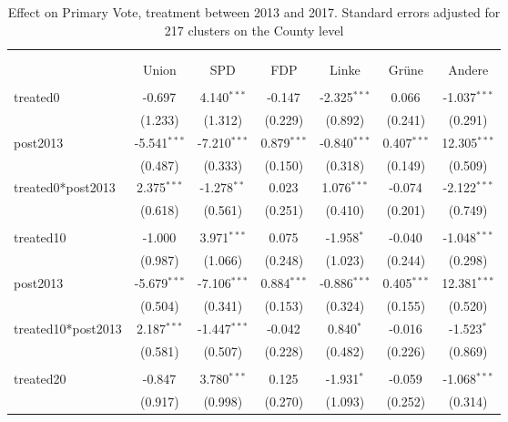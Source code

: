 \documentclass[12pt]{article}
\begin{document}
 
\begin{table}[!htbp] \centering
  \caption{Effect on Primary Vote, treatment between 2013 and 2017. Standard errors adjusted for 217 clusters on the County level}
\begin{tabular}{@{\extracolsep{5pt}}lcccccc}
\\[-1.8ex]\hline
\hline \\[-1.8ex]
\\[-1.8ex] & \multicolumn{1}{c}{Union} & \multicolumn{1}{c}{SPD} & \multicolumn{1}{c}{FDP} & \multicolumn{1}{c}{Linke} & \multicolumn{1}{c}{Grüne} & \multicolumn{1}{c}{Andere}  \\
\hline \\[-1.8ex]
 treated0 & -0.697$^{}$ & 4.140$^{***}$ & -0.147$^{}$ & -2.325$^{***}$ & 0.066$^{}$ & -1.037$^{***}$ \\
  & (1.233) & (1.312) & (0.229) & (0.892) & (0.241) & (0.291) \\
 post2013 & -5.541$^{***}$ & -7.210$^{***}$ & 0.879$^{***}$ & -0.840$^{***}$ & 0.407$^{***}$ & 12.305$^{***}$ \\
  & (0.487) & (0.333) & (0.150) & (0.318) & (0.149) & (0.509) \\
 treated0*post2013 & 2.375$^{***}$ & -1.278$^{**}$ & 0.023$^{}$ & 1.076$^{***}$ & -0.074$^{}$ & -2.122$^{***}$ \\
  & (0.618) & (0.561) & (0.251) & (0.410) & (0.201) & (0.749) \\
\hline \\[-1.8ex]
 treated10 & -1.000$^{}$ & 3.971$^{***}$ & 0.075$^{}$ & -1.958$^{*}$ & -0.040$^{}$ & -1.048$^{***}$ \\
  & (0.987) & (1.066) & (0.248) & (1.023) & (0.244) & (0.298) \\
 post2013 & -5.679$^{***}$ & -7.106$^{***}$ & 0.884$^{***}$ & -0.886$^{***}$ & 0.405$^{***}$ & 12.381$^{***}$ \\
  & (0.504) & (0.341) & (0.153) & (0.324) & (0.155) & (0.520) \\
 treated10*post2013 & 2.187$^{***}$ & -1.447$^{***}$ & -0.042$^{}$ & 0.840$^{*}$ & -0.016$^{}$ & -1.523$^{*}$ \\
  & (0.581) & (0.507) & (0.228) & (0.482) & (0.226) & (0.869) \\
\hline \\[-1.8ex]
 treated20 & -0.847$^{}$ & 3.780$^{***}$ & 0.125$^{}$ & -1.931$^{*}$ & -0.059$^{}$ & -1.068$^{***}$ \\
  & (0.917) & (0.998) & (0.270) & (1.093) & (0.252) & (0.314) \\

\end{tabular}
\end{table}
\end{document}
